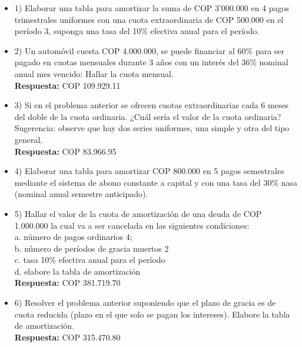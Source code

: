 \begin{itemize}
 \item 1)	Elaborar una tabla para amortizar la suma de COP 3'000.000 en 4 pagos trimestrales uniformes con una cuota extraordinaria de COP 500.000 en el período 3, suponga una tasa del 10\% efectiva anual para el período. \\
       \medskip

 \item 2)	Un automóvil cuesta COP 4.000.000, se puede financiar al 60\% para ser pagado en cuotas mensuales durante 3 años con un interés del 36\% nominal anual mes vencido: Hallar la cuota mensual.\\
       \textbf{ Respuesta:} COP 109.929.11
       \medskip

 \item 3)	Si en el problema anterior se ofrecen cuotas extraordinarias cada 6 meses del doble de la cuota ordinaria. ¿Cuál sería el valor de la cuota ordinaria?\\
       Sugerencia: observe que hay dos series uniformes, una simple y otra del tipo general.\\
       \textbf{Respuesta:} COP 83.966.95
       \medskip

 \item 4)	Elaborar una tabla para amortizar COP 800.000 en 5 pagos semestrales mediante el sistema de abono constante a capital y con una tasa del 30\% nasa (nominal anual semestre anticipado).
       \medskip

 \item 5)	 Hallar el valor de la cuota de amortización de una deuda de COP 1.000.000 la cual va a ser cancelada en las siguientes condiciones:\\
       a.	número de pagos ordinarios 4;\\
       b.	número de períodos de gracia muertos 2\\
       c.	tasa 10\% efectiva anual para el período \\
       d.	elabore la tabla de amortización\\
       \textbf{ Respuesta:} COP 381.719.70
       \medskip

 \item 6)	Resolver el problema anterior suponiendo que el plazo de gracia es de cuota reducida (plazo en el que solo se pagan los intereses). Elabore la tabla de amortización.\\
       \textbf{Respuesta: }COP 315.470.80
       \medskip


\end{itemize}
